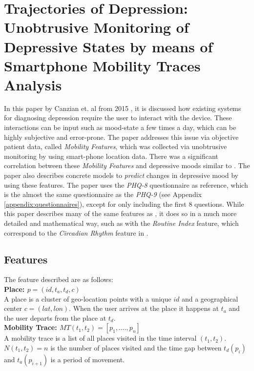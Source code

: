 \section{Trajectories of Depression: Unobtrusive Monitoring of Depressive States by means of Smartphone Mobility Traces Analysis} 

In this paper by Canzian et. al from 2015 \cite{Canzian2015}, it is discussed how existing systems for diagnosing depression require the user to interact with the device. These interactions can be input such as mood-state a few times a day, which can be highly subjective and error-prone. The paper addresses this issue via objective patient data, called \textit{Mobility Features}, which was collected via unobtrusive monitoring by using smart-phone location data. There was a significant correlation between these \textit{Mobility Features} and depressive moods similar to \cite{Saeb2015}. The paper also describes concrete models to \textit{predict} changes in depressive mood by using these features. The paper uses the \textit{PHQ-8} questionnaire as reference, which is the almost the same questionnaire as the \textit{PHQ-9} (see Appendix \ref{appendix:questionnaires}), except for only including the first 8 questions. While this paper describes many of the same features as \cite{Saeb2015}, it does so in a much more detailed and mathematical way, such as with the \textit{Routine Index} feature, which correspond to the \textit{Circadian Rhythm} feature in \cite{Saeb2015}.

\subsection{Features}
The feature described are as follows:\\

\textbf{Place: $p = (id, t_a, t_d, c)$}\\
A place is a cluster of geo-location points with a unique $id$ and a geographical center $c = (lat, lon)$. When the user arrives at the place it happens at $t_a$ and the user departs from the place at $t_d$. \\

\textbf{Mobility Trace: $MT(t_1, t_2) = [p_1, ...., p_n]$}\\
A mobility trace is a list of all places visited in the time interval $(t_1, t_2)$. $N(t_1, t_2) = n$ is the number of places visited and the time gap between $t_d (p_i)$ and $t_a (p_{i+1})$ is a period of movement.\\

